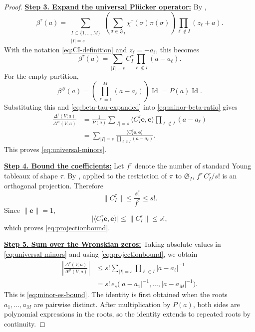 \documentclass[12pt,letterpaper,reqno]{amsart}
\theoremstyle{definition}
\numberwithin{equation}{section}
\newcommand{\ev}{\bm  e}
\begin{document}
\begin{proof}
\medskip\noindent
\textbf{\underline{Step 3. Expand the universal Pl\"ucker operator:}}
By \cite[equation~(1.2)]{KP26},
\[
\beta^\tau(a)
=
\sum_{\substack{I\subset\{1,\ldots,M\}\\|I|=s}}
\left(
 \sum_{\sigma\in\mathfrak S_I}
 \chi^\tau(\sigma)\pi(\sigma)
\right)
\prod_{\ell\notin I}(z_\ell+a).
\]
With the notation \eqref{eq:CI-definition} and
\(z_\ell=-a_\ell\), this becomes
\begin{equation}\label{eq:beta-tau-expanded}
 \beta^\tau(a)
 =
 \sum_{|I|=s}
 C_I^\tau
 \prod_{\ell\notin I}(a-a_\ell).
\end{equation}
For the empty partition,
\[
\beta^\varnothing(a)
=
\left(
\prod_{\ell=1}^M(a-a_\ell)
\right)\operatorname{Id}
=
P(a)\operatorname{Id}.
\]
Substituting this and \eqref{eq:beta-tau-expanded} into
\eqref{eq:minor-beta-ratio} gives
\[
\begin{aligned}
\frac{\Delta^\tau(V;a)}
     {\Delta^\varnothing(V;a)}
&=
\frac1{P(a)}
\sum_{|I|=s}
\langle C_I^\tau\ev,\ev\rangle
\prod_{\ell\notin I}(a-a_\ell)\\
&=
\sum_{|I|=s}
\frac{\langle C_I^\tau\ev,\ev\rangle}
     {\prod_{\ell\in I}(a-a_\ell)}.
\end{aligned}
\]
This proves \eqref{eq:universal-minors}.

\medskip\noindent
\textbf{\underline{Step 4. Bound the coefficients:}}
Let \(f^\tau\) denote the number of standard Young tableaux of shape
\(\tau\). By \cite[Proposition~2.16]{KP26}, applied to the restriction
of \(\pi\) to \(\mathfrak S_I\),
$
{f^\tau\,C_I^\tau}/{s!}
$
is an orthogonal projection. Therefore
\[
\|C_I^\tau\|
\leq
\frac{s!}{f^\tau}
\leq s!.
\]
Since \(\|\ev\|=1\),
\[
\bigl|\langle C_I^\tau\ev,\ev\rangle\bigr|
\leq
\|C_I^\tau\|
\leq s!,
\]
which proves \eqref{eq:projectionbound}.

\medskip\noindent
\textbf{\underline{Step 5. Sum over the Wronskian zeros:}}
Taking absolute values in \eqref{eq:universal-minors} and using
\eqref{eq:projectionbound}, we obtain
\[
\begin{aligned}
\left|
\frac{\Delta^\tau(V;a)}
     {\Delta^\varnothing(V;a)}
\right|
&\leq
s!
\sum_{|I|=s}
\prod_{\ell\in I}|a-a_\ell|^{-1}\\
&=
s!\,
e_s\bigl(
|a-a_1|^{-1},\ldots,|a-a_M|^{-1}
\bigr).
\end{aligned}
\]
This is \eqref{eq:minor-es-bound}. The identity is first obtained
when the roots \(a_1,\ldots,a_M\) are pairwise distinct. After
multiplication by \(P(a)\), both sides are polynomial expressions in the
roots, so the identity extends to repeated roots by continuity.
\end{proof}
\end{document}
